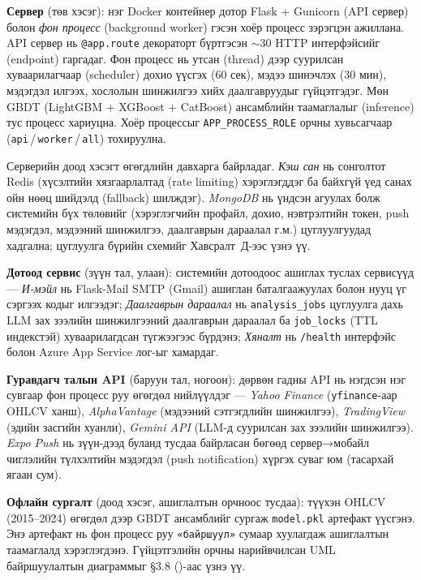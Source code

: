 \textbf{Сервер} (төв хэсэг): нэг Docker контейнер дотор Flask + Gunicorn (API сервер) болон \emph{фон процесс} (background worker) гэсэн хоёр процесс зэрэгцэн ажиллана. API сервер нь \texttt{@app.route} декораторт бүртгэсэн $\sim$30 HTTP интерфэйсийг (endpoint) гаргадаг. Фон процесс нь утсан (thread) дээр суурилсан хуваарилагчаар (scheduler) дохио үүсгэх (60 сек), мэдээ шинэчлэх (30 мин), мэдэгдэл илгээх, хослолын шинжилгээ хийх даалгавруудыг гүйцэтгэдэг. Мөн GBDT (LightGBM + XGBoost + CatBoost) ансамблийн таамаглалыг (inference) тус процесс хариуцна. Хоёр процессыг \texttt{APP\_PROCESS\_ROLE} орчны хувьсагчаар (\texttt{api}\,/\,\texttt{worker}\,/\,\texttt{all}) тохируулна.

Серверийн доод хэсэгт өгөгдлийн давхарга байрладаг. \emph{Кэш сан} нь сонголтот Redis (хүсэлтийн хязгаарлалтад (rate limiting) хэрэглэгддэг ба байхгүй үед санах ойн нөөц шийдэлд (fallback) шилждэг). \emph{MongoDB} нь үндсэн агуулах болж системийн бүх төлөвийг (хэрэглэгчийн профайл, дохио, нэвтрэлтийн токен, push мэдэгдэл, мэдээний шинжилгээ, даалгаврын дараалал г.м.) цуглуулгуудад хадгална; цуглуулга бүрийн схемийг Хавсралт~Д-ээс үзнэ үү.

\textbf{Дотоод сервис} (зүүн тал, улаан): системийн дотоодоос ашиглах туслах сервисүүд — \emph{И-мэйл} нь Flask-Mail SMTP (Gmail) ашиглан баталгаажуулах болон нууц үг сэргээх кодыг илгээдэг; \emph{Даалгаврын дараалал} нь \texttt{analysis\_jobs} цуглуулга дахь LLM зах зээлийн шинжилгээний даалгаврын дараалал ба \texttt{job\_locks} (TTL индекстэй) хуваарилагдсан түгжээгээс бүрдэнэ; \emph{Хяналт} нь \texttt{/health} интерфэйс болон Azure App Service лог-ыг хамардаг.

\textbf{Гуравдагч талын API} (баруун тал, ногоон): дөрвөн гадны API нь нэгдсэн нэг сувгаар фон процесс руу өгөгдөл нийлүүлдэг — \emph{Yahoo Finance} (\texttt{yfinance}-аар OHLCV ханш), \emph{AlphaVantage} (мэдээний сэтгэгдлийн шинжилгээ), \emph{TradingView} (эдийн засгийн хуанли), \emph{Gemini API} (LLM-д суурилсан зах зээлийн шинжилгээ). \emph{Expo Push} нь зүүн-дээд буланд тусдаа байрласан бөгөөд сервер→мобайл чиглэлийн түлхэлтийн мэдэгдэл (push notification) хүргэх суваг юм (тасархай ягаан сум).

\textbf{Офлайн сургалт} (доод хэсэг, ашиглалтын орчноос тусдаа): түүхэн OHLCV (2015--2024) өгөгдөл дээр GBDT ансамблийг сургаж \texttt{model.pkl} артефакт үүсгэнэ. Энэ артефакт нь фон процесс руу \texttt{«байршуул»} сумаар хуулагдаж ашиглалтын таамаглалд хэрэглэгдэнэ. Гүйцэтгэлийн орчны нарийвчилсан UML байршуулалтын диаграммыг §3.8 ()-аас үзнэ үү.

